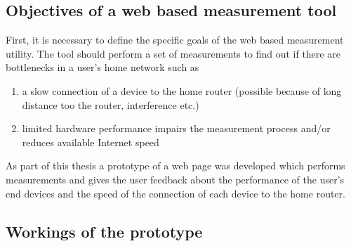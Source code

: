 \documentclass{sig-alternate-10pt}
\begin{document}
\subsection{Objectives of a web based measurement tool}
\label{subsec:objectives}

First, it is necessary to define the specific goals of the web based measurement utility. The tool should perform a set of measurements to find out if there are bottlenecks in a user's home network such as
\begin{enumerate}
\item a slow connection of a device to the home router (possible because of long distance too the router, interference etc.)
\item limited hardware performance impairs the measurement process and/or reduces available Internet speed
\end{enumerate}

As part of this thesis a prototype of a web page was developed which performs measurements and gives the user feedback about the performance of the user's end devices and the speed of the connection of each device to the home router. 

\subsection{Workings of the prototype}
\label{subsec:workingsprototype}
\end{document}

